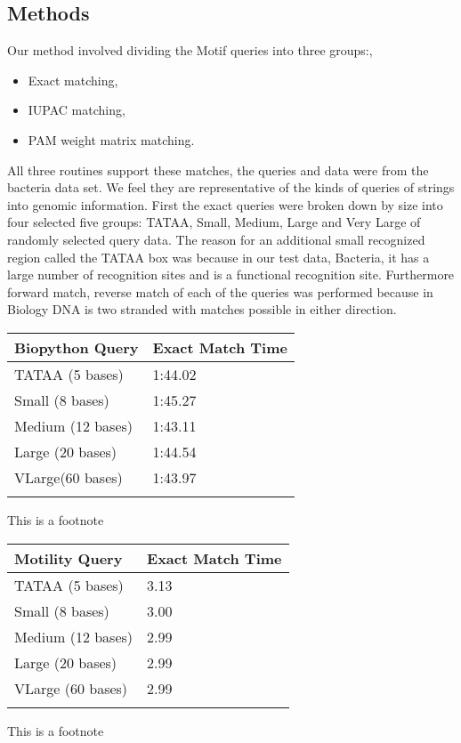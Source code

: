 \documentclass{bioinfo}
\begin{document}
\begin{methods}
\section{Methods}
Our method involved dividing the Motif queries into three groups:, 
\begin{itemize}
\item Exact matching,
\item IUPAC matching,
\item PAM weight matrix matching.  
\end{itemize}
All three routines support these matches,
the queries and data were from the bacteria data set. \citealp{BactXX} 
We feel they are representative of the kinds of queries of strings into
genomic information. First the exact queries were broken down by size into
four selected five groups:  TATAA, Small, Medium, Large and Very Large 
of randomly selected query data. The reason for an additional 
small recognized region called the TATAA box was because
in our test data, Bacteria, it 
has a large number of recognition sites and is a functional recognition site.  
Furthermore forward match, reverse match 
of each of  the queries was performed because in Biology 
DNA is two stranded with
matches possible in either direction.

\begin{table}[!t]
{\begin{tabular}{ll}\toprule
Biopython Query & Exact Match Time \\\midrule
TATAA (5 bases) & 1:44.02 \\
Small (8 bases) & 1:45.27 \\
Medium (12 bases)& 1:43.11 \\
Large (20 bases) & 1:44.54 \\
VLarge(60 bases) & 1:43.97 \\\botrule
\end{tabular}}{This is a footnote}
\end{table}

\begin{table}[!t]
{\begin{tabular}{ll}\toprule
Motility Query & Exact Match Time \\\midrule
TATAA (5 bases) & 3.13 \\
Small (8 bases) & 3.00 \\
Medium (12 bases)& 2.99 \\
Large (20 bases) & 2.99 \\
VLarge (60 bases) & 2.99 \\\botrule
\end{tabular}}{This is a footnote}
\end{table}


\end{methods}
\end{document}
